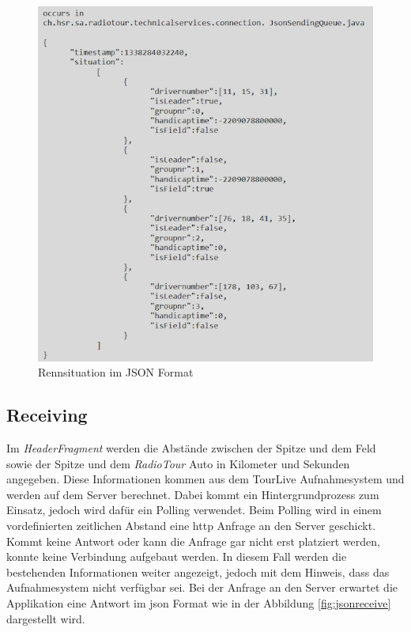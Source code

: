 \begin{figure}[H]
\caption{Rennsituation im JSON Format}
\label{fig:jsonsend}
\centering
\includegraphics[scale=1]{05bericht/images/json.png}
\end{figure}


\subsection{Receiving}
Im \textit{HeaderFragment} werden die Abstände zwischen der Spitze und dem Feld sowie der Spitze und dem \textit{RadioTour} Auto in Kilometer und Sekunden angegeben. Diese Informationen kommen aus dem TourLive Aufnahmesystem und werden auf dem Server berechnet. Dabei kommt ein Hintergrundprozess zum Einsatz, jedoch wird dafür ein Polling verwendet. Beim Polling wird in einem vordefinierten zeitlichen Abstand eine \gls{http} Anfrage an den Server geschickt. Kommt keine Antwort oder kann die Anfrage gar nicht erst platziert werden, konnte keine Verbindung aufgebaut werden. In diesem Fall werden die bestehenden Informationen weiter angezeigt, jedoch mit dem Hinweis, dass das Aufnahmesystem nicht verfügbar sei. Bei der Anfrage an den Server erwartet die Applikation eine Antwort im \gls{json} Format wie in der Abbildung \ref{fig:jsonreceive} dargestellt wird.

